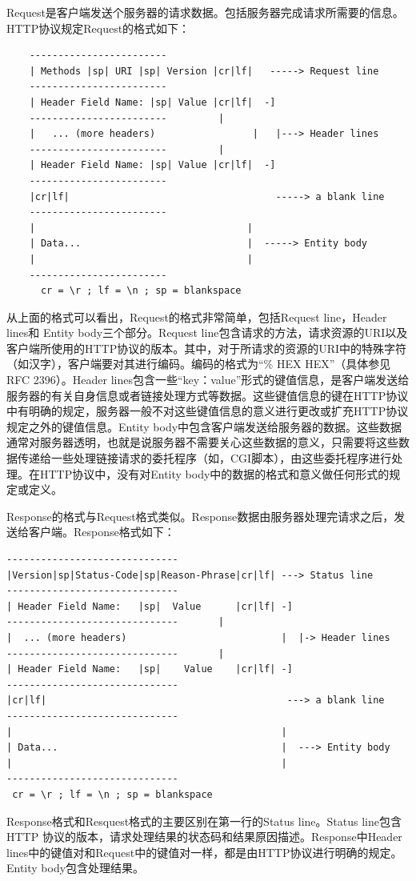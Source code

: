 \documentclass[twoside, xetex]{report}
\begin{document}
	Request是客户端发送个服务器的请求数据。包括服务器完成请求所需要的信息。HTTP协议规定Request的格式如下：
\begin{lstlisting}
    ------------------------
    | Methods |sp| URI |sp| Version |cr|lf|   -----> Request line
    ------------------------
    | Header Field Name: |sp| Value |cr|lf|  -]
    ------------------------         |
    |   ... (more headers)                 |   |---> Header lines
    ------------------------         |
    | Header Field Name: |sp| Value |cr|lf|  -]
    ------------------------
    |cr|lf|                                    -----> a blank line
    ------------------------
    |                                     |
    | Data...                             |  -----> Entity body
    |                                     |
    ------------------------
      cr = \r ; lf = \n ; sp = blankspace
\end{lstlisting}
 	从上面的格式可以看出，Request的格式非常简单，包括Request line，Header lines和 Entity body三个部分。Request line包含请求的方法，请求资源的URI以及客户端所使用的HTTP协议的版本。其中，对于所请求的资源的URI中的特殊字符（如汉字），客户端要对其进行编码。编码的格式为“\% HEX HEX”（具体参见RFC 2396）。Header lines包含一些“key：value”形式的键值信息，是客户端发送给服务器的有关自身信息或者链接处理方式等数据。这些键值信息的键在HTTP协议中有明确的规定，服务器一般不对这些键值信息的意义进行更改或扩充HTTP协议规定之外的键值信息。Entity body中包含客户端发送给服务器的数据。这些数据通常对服务器透明，也就是说服务器不需要关心这些数据的意义，只需要将这些数据传递给一些处理链接请求的委托程序（如，CGI脚本），由这些委托程序进行处理。在HTTP协议中，没有对Entity body中的数据的格式和意义做任何形式的规定或定义。
 	
 	Response的格式与Request格式类似。Response数据由服务器处理完请求之后，发送给客户端。Response格式如下：
\begin{lstlisting}
------------------------------
|Version|sp|Status-Code|sp|Reason-Phrase|cr|lf| ---> Status line
------------------------------
| Header Field Name:   |sp|  Value      |cr|lf| -]
------------------------------       |
|  ... (more headers)                           |  |-> Header lines
------------------------------       |
| Header Field Name:   |sp|    Value    |cr|lf| -]
------------------------------
|cr|lf|                                          ---> a blank line
------------------------------
|                                               |
| Data...                                       |  ---> Entity body
|                                               |
------------------------------
 cr = \r ; lf = \n ; sp = blankspace
\end{lstlisting}
 	Response格式和Resquest格式的主要区别在第一行的Status line。Status line包含HTTP 协议的版本，请求处理结果的状态码和结果原因描述。Response中Header lines中的键值对和Request中的键值对一样，都是由HTTP协议进行明确的规定。Entity body包含处理结果。
 	
\end{document}
